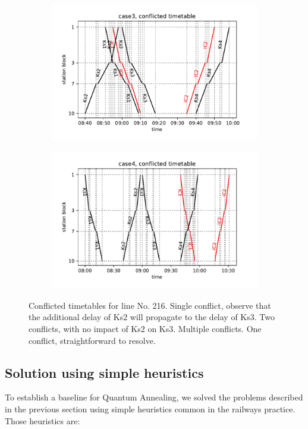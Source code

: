 \begin{figure}
  \begin{subfigure}[b]{0.5\textwidth}
    \caption{} \label{c3}
    \includegraphics[width=\textwidth]{figures/case3_conflict}
  \end{subfigure}
  \begin{subfigure}[b]{0.5\textwidth}
    \caption{}\label{c4}
    \includegraphics[width=\textwidth]{figures/case4_conflict}
  \end{subfigure}
  \caption{Conflicted timetables for line No. 216.  Single conflict, observe
    that the additional delay of Ks$2$ will propagate to the delay of Ks$3$.
     Two conflicts, with no impact of Ks$2$ on Ks$3$. 
    Multiple conflicts.  One conflict, straightforward to resolve.}
  \label{fig:conflictlarge}
\end{figure}

\subsection{Solution using simple heuristics}
To establish a baseline for Quantum Annealing, we solved the problems described
in the previous section using simple heuristics common in the railways
practice. Those heuristics are:

